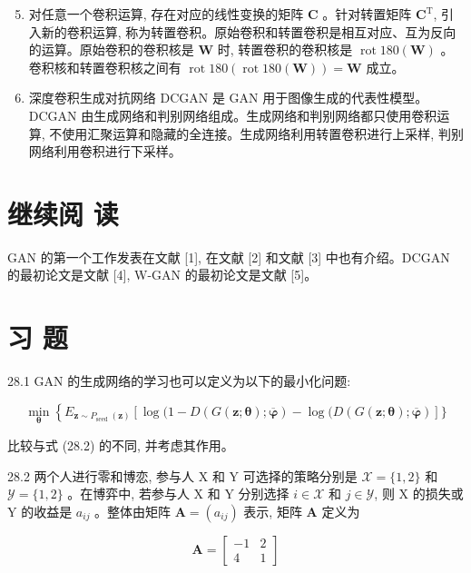 \documentclass[10pt]{article}
\begin{document}
\begin{enumerate}
  \setcounter{enumi}{4}
  \item 对任意一个卷积运算, 存在对应的线性变换的矩阵 $\boldsymbol{C}$ 。针对转置矩阵 $\boldsymbol{C}^{\mathrm{T}}$, 引入新的卷积运算, 称为转置卷积。原始卷积和转置卷积是相互对应、互为反向的运算。原始卷积的卷积核是 $\boldsymbol{W}$ 时, 转置卷积的卷积核是 $\operatorname{rot} 180(\boldsymbol{W})$ 。卷积核和转置卷积核之间有 $\operatorname{rot} 180(\operatorname{rot} 180(\boldsymbol{W}))=\boldsymbol{W}$ 成立。

  \item 深度卷积生成对抗网络 DCGAN 是 GAN 用于图像生成的代表性模型。DCGAN 由生成网络和判别网络组成。生成网络和判别网络都只使用卷积运算, 不使用汇聚运算和隐藏的全连接。生成网络利用转置卷积进行上采样, 判别网络利用卷积进行下采样。

\end{enumerate}

\section*{继续阅 读}
GAN 的第一个工作发表在文献 [1], 在文献 [2] 和文献 [3] 中也有介绍。DCGAN 的最初论文是文献 [4], W-GAN 的最初论文是文献 [5]。

\section*{习 题}
28.1 GAN 的生成网络的学习也可以定义为以下的最小化问题:

$$
\min _{\boldsymbol{\theta}}\left\{E_{\boldsymbol{z} \sim P_{\text {seed }}(\boldsymbol{z})}[\log (1-D(G(\boldsymbol{z} ; \boldsymbol{\theta}) ; \overline{\boldsymbol{\varphi}})-\log (D(G(\boldsymbol{z} ; \boldsymbol{\theta}) ; \overline{\boldsymbol{\varphi}})]\}\right.
$$

比较与式 (28.2) 的不同, 并考虑其作用。

28.2 两个人进行零和博恋, 参与人 $\mathrm{X}$ 和 $\mathrm{Y}$ 可选择的策略分别是 $\mathcal{X}=\{1,2\}$ 和 $\mathcal{Y}=\{1,2\}$ 。在博弈中, 若参与人 $\mathrm{X}$ 和 $\mathrm{Y}$ 分别选择 $i \in \mathcal{X}$ 和 $j \in \mathcal{Y}$, 则 $\mathrm{X}$ 的损失或 $\mathrm{Y}$ 的收益是 $a_{i j}$ 。整体由矩阵 $\boldsymbol{A}=\left(a_{i j}\right)$ 表示, 矩阵 $\boldsymbol{A}$ 定义为

$$
\boldsymbol{A}=\left[\begin{array}{rr}
-1 & 2 \\
4 & 1
\end{array}\right]
$$
\end{document}
